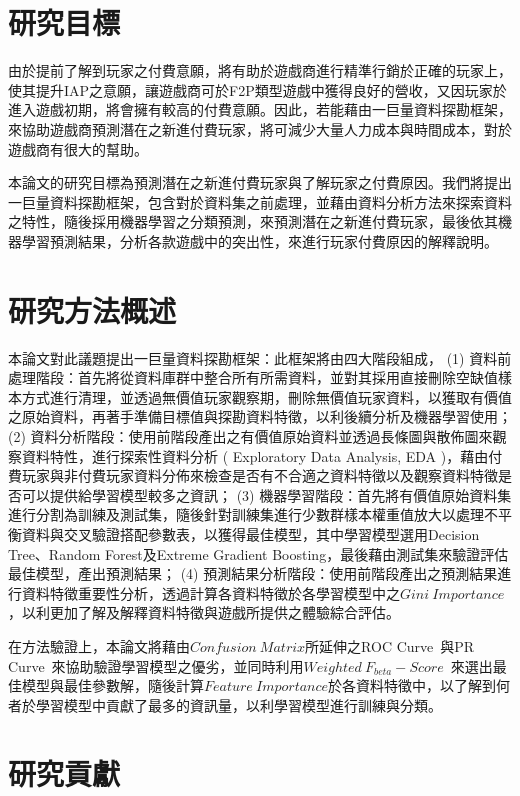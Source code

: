 \section{研究目標}

由於提前了解到玩家之付費意願，將有助於遊戲商進行精準行銷於正確的玩家上，使其提升IAP之意願，讓遊戲商可於F2P類型遊戲中獲得良好的營收，又因玩家於進入遊戲初期，將會擁有較高的付費意願。因此，若能藉由一巨量資料探勘框架，來協助遊戲商預測潛在之新進付費玩家，將可減少大量人力成本與時間成本，對於遊戲商有很大的幫助。

本論文的研究目標為預測潛在之新進付費玩家與了解玩家之付費原因。我們將提出一巨量資料探勘框架，包含對於資料集之前處理，並藉由資料分析方法來探索資料之特性，隨後採用機器學習之分類預測，來預測潛在之新進付費玩家，最後依其機器學習預測結果，分析各款遊戲中的突出性，來進行玩家付費原因的解釋說明。

\section{研究方法概述}

本論文對此議題提出一巨量資料探勘框架：此框架將由四大階段組成， (1) 資料前處理階段：首先將從資料庫群中整合所有所需資料，並對其採用直接刪除空缺值樣本方式進行清理，並透過無價值玩家觀察期，刪除無價值玩家資料，以獲取有價值之原始資料，再著手準備目標值與探勘資料特徵，以利後續分析及機器學習使用； (2) 資料分析階段：使用前階段產出之有價值原始資料並透過長條圖與散佈圖來觀察資料特性，進行探索性資料分析 ( Exploratory Data Analysis, EDA )，藉由付費玩家與非付費玩家資料分佈來檢查是否有不合適之資料特徵以及觀察資料特徵是否可以提供給學習模型較多之資訊； (3) 機器學習階段：首先將有價值原始資料集進行分割為訓練及測試集，隨後針對訓練集進行少數群樣本權重值放大以處理不平衡資料與交叉驗證搭配參數表，以獲得最佳模型，其中學習模型選用Decision Tree、Random Forest及Extreme Gradient Boosting，最後藉由測試集來驗證評估最佳模型，產出預測結果； (4) 預測結果分析階段：使用前階段產出之預測結果進行資料特徵重要性分析，透過計算各資料特徵於各學習模型中之$Gini\ Importance$，以利更加了解及解釋資料特徵與遊戲所提供之體驗綜合評估。

在方法驗證上，本論文將藉由$Confusion\ Matrix$所延伸之ROC Curve~\cite{fawcett2006introduction}與PR Curve~\cite{article}來協助驗證學習模型之優劣，並同時利用$Weighted\ F_{beta} - Score$~\cite{Goutte2005API}來選出最佳模型與最佳參數解，隨後計算$Feature\ Importance$於各資料特徵中，以了解到何者於學習模型中貢獻了最多的資訊量，以利學習模型進行訓練與分類。

\section{研究貢獻}

